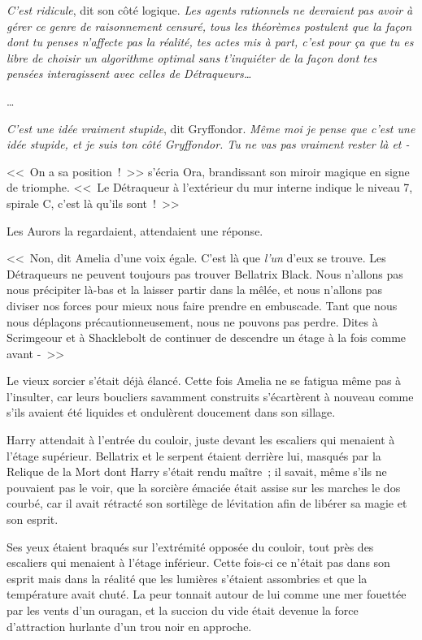 \emph{C'est ridicule}, dit son côté logique. \emph{Les agents rationnels ne devraient pas avoir à gérer ce genre de raisonnement censuré, tous les théorèmes postulent que la façon dont tu penses n'affecte pas la réalité, tes actes mis à part, c'est pour ça que tu es libre de choisir un algorithme optimal sans t'inquiéter de la façon dont tes pensées interagissent avec celles de Détraqueurs…}

…

\emph{C'est une idée vraiment stupide}, dit Gryffondor. \emph{Même moi je pense que c'est une idée stupide, et je suis ton côté Gryffondor. Tu ne vas pas vraiment rester là et -}

\later

<<~On a sa position~!~>> s'écria Ora, brandissant son miroir magique en signe de triomphe. <<~Le Détraqueur à l'extérieur du mur interne indique le niveau 7, spirale C, c'est là qu'ils sont~!~>>

Les Aurors la regardaient, attendaient une réponse.

<<~Non, dit Amelia d'une voix égale. C'est là que \emph{l'un} d'eux se trouve. Les Détraqueurs ne peuvent toujours pas trouver Bellatrix Black. Nous n'allons pas nous précipiter là-bas et la laisser partir dans la mêlée, et nous n'allons pas diviser nos forces pour mieux nous faire prendre en embuscade. Tant que nous nous déplaçons précautionneusement, nous ne pouvons pas perdre. Dites à Scrimgeour et à Shacklebolt de continuer de descendre un étage à la fois comme avant -~>>

Le vieux sorcier s'était déjà élancé. Cette fois Amelia ne se fatigua même pas à l'insulter, car leurs boucliers savamment construits s'écartèrent à nouveau comme s'ils avaient été liquides et ondulèrent doucement dans son sillage.

\later

Harry attendait à l'entrée du couloir, juste devant les escaliers qui menaient à l'étage supérieur. Bellatrix et le serpent étaient derrière lui, masqués par la Relique de la Mort dont Harry s'était rendu maître~; il savait, même s'ils ne pouvaient pas le voir, que la sorcière émaciée était assise sur les marches le dos courbé, car il avait rétracté son sortilège de lévitation afin de libérer sa magie et son esprit.

Ses yeux étaient braqués sur l'extrémité opposée du couloir, tout près des escaliers qui menaient à l'étage inférieur. Cette fois-ci ce n'était pas dans son esprit mais dans la réalité que les lumières s'étaient assombries et que la température avait chuté. La peur tonnait autour de lui comme une mer fouettée par les vents d'un ouragan, et la succion du vide était devenue la force d'attraction hurlante d'un trou noir en approche.

